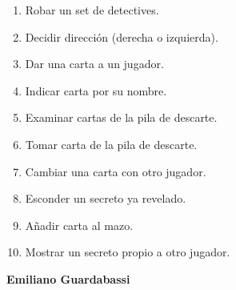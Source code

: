 \documentclass[12pt,a4paper]{article}
\begin{document}
\begin{enumerate}
  \item Robar un set de detectives.
  \item Decidir dirección (derecha o izquierda).
  \item Dar una carta a un jugador.
  \item Indicar carta por su nombre.
  \item Examinar cartas de la pila de descarte.
  \item Tomar carta de la pila de descarte.
  \item Cambiar una carta con otro jugador.
  \item Esconder un secreto ya revelado.
  \item Añadir carta al mazo.
  \item Mostrar un secreto propio a otro jugador.
\end{enumerate}



\vspace{2cm}
\begin{flushright}
\textbf{Emiliano Guardabassi}
\end{flushright}
\end{document}
